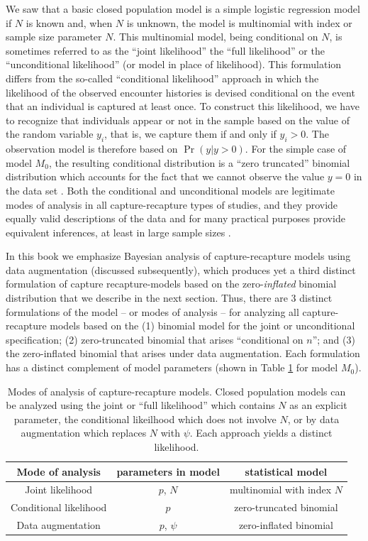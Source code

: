 We saw that a basic closed population model is a simple logistic
regression model if $N$ is known and, when $N$ is unknown, the model
is multinomial with index or sample size parameter $N$. This
multinomial model, being conditional on $N$, is sometimes referred to
as the ``joint likelihood'' the ``full likelihood'' or the
``unconditional likelihood'' (or model in place of likelihood). This
formulation differs from the so-called ``conditional likelihood''
approach in which the likelihood of the observed encounter histories
is devised conditional on the event that an individual is captured at
least once.  To construct this likelihood, we have to recognize that
individuals appear or not in the sample based on the value of the
random variable $y_{i}$, that is, we capture them if and only if
$y_{i}>0$.  The observation model is therefore based on $\Pr(y|y>0)$.
For the simple case of model $M_0$, the resulting conditional
distribution is a ``zero truncated'' binomial distribution which
accounts for the fact that we cannot observe the value $y=0$ in the
data set \citep[see][sec. 5.1]{royle_dorazio:2008}.  Both the
conditional and unconditional models are legitimate modes of analysis
in all capture-recapture types of studies, and they provide equally
valid descriptions of the data and for many practical purposes provide
equivalent inferences, at least in large sample sizes
\citep{sanathanan:1972}.

In this book we emphasize Bayesian analysis of capture-recapture
models using data augmentation (discussed subsequently), which
produces yet a third distinct formulation of capture recapture-models
based on the zero-{\it inflated} binomial distribution that we
describe in the next section.  Thus, there are 3 distinct formulations
of the model -- or modes of analysis -- for analyzing all
capture-recapture models based on the (1) binomial model for the joint
or unconditional specification; (2) zero-truncated binomial that
arises ``conditional on $n$''; and (3) the zero-inflated binomial that
arises under data augmentation.  Each formulation has a distinct
complement of model parameters (shown in Table \ref{tab.3.modes} for
model $M_0$).


\begin{table}
\centering
\caption{Modes of analysis of capture-recapture models. Closed
  population models can be analyzed using the joint or ``full
  likelihood'' which contains $N$ as an explicit parameter, the
  conditional likeilhood which does not involve $N$, or by data
  augmentation which replaces $N$ with $\psi$. Each approach yields a
  distinct likelihood.}
\begin{tabular}{ccc}
Mode of analysis & parameters in model & statistical model \\ \hline
Joint likelihood                &	$p$, $N$	&	multinomial with index $N$\\
Conditional likelihood 		&	$p$	&	zero-truncated binomial \\
Data augmentation		&	$p$, $\psi$	&	zero-inflated binomial\\
\end{tabular}
\label{tab.3.modes}
\end{table}



